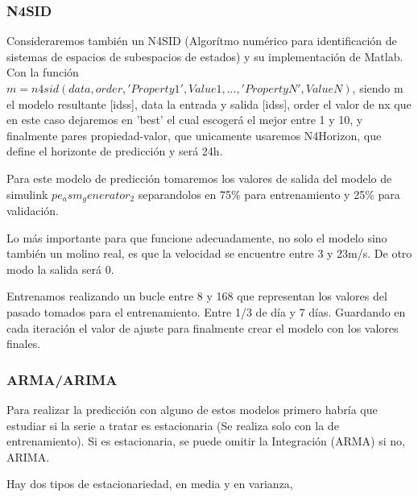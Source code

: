 \subsubsection{N4SID}
\label{ssub:n4sid}

Consideraremos también un N4SID (Algorítmo numérico para identificación de sistemas de espacios de subespacios de estados) y su implementación de Matlab. Con la función $m = n4sid(data,order,'Property1',Value1,...,'PropertyN',ValueN)$, siendo m el modelo resultante [idss], data la entrada y salida [idss], order el valor de nx que en este caso dejaremos en 'best' el cual escogerá el mejor entre 1 y 10, y finalmente pares propiedad-valor, que unicamente usaremos N4Horizon, que define el horizonte de predicción y será 24h.

Para este modelo de predicción tomaremos los valores de salida del modelo de simulink $pe_asm_generator_2$ separandolos en 75\% para entrenamiento y 25\% para validación. 

Lo más importante para que funcione adecuadamente, no solo el modelo sino también un molino real, es que la velocidad se encuentre entre 3 y 23m/s. De otro modo la salida será 0.

Entrenamos realizando un bucle entre 8 y 168 que representan los valores del pasado tomados para el entrenamiento. Entre 1/3 de día y 7 días. Guardando en cada iteración el valor de ajuste para finalmente crear el modelo con los valores finales.



\subsubsection{ARMA/ARIMA}
\label{ssub:arma_arima}

Para realizar la predicción con alguno de estos modelos primero habría que estudiar si la serie a tratar es estacionaria (Se realiza solo con la de entrenamiento). Si es estacionaria, se puede omitir la Integración (ARMA) si no, ARIMA.

Hay dos tipos de estacionariedad, en media y en varianza, 


